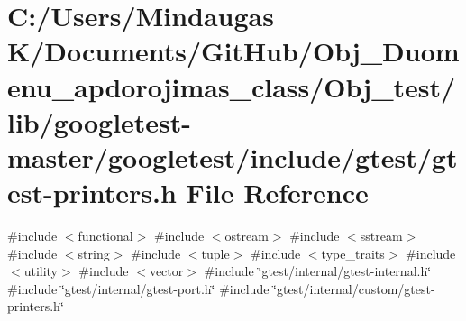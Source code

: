 \hypertarget{_obj__test_2lib_2googletest-master_2googletest_2include_2gtest_2gtest-printers_8h}{}\section{C\+:/\+Users/\+Mindaugas K/\+Documents/\+Git\+Hub/\+Obj\+\_\+\+Duomenu\+\_\+apdorojimas\+\_\+class/\+Obj\+\_\+test/lib/googletest-\/master/googletest/include/gtest/gtest-\/printers.h File Reference}
\label{_obj__test_2lib_2googletest-master_2googletest_2include_2gtest_2gtest-printers_8h}
{\ttfamily \#include $<$functional$>$}\newline
{\ttfamily \#include $<$ostream$>$}\newline
{\ttfamily \#include $<$sstream$>$}\newline
{\ttfamily \#include $<$string$>$}\newline
{\ttfamily \#include $<$tuple$>$}\newline
{\ttfamily \#include $<$type\+\_\+traits$>$}\newline
{\ttfamily \#include $<$utility$>$}\newline
{\ttfamily \#include $<$vector$>$}\newline
{\ttfamily \#include \char`\"{}gtest/internal/gtest-\/internal.\+h\char`\"{}}\newline
{\ttfamily \#include \char`\"{}gtest/internal/gtest-\/port.\+h\char`\"{}}\newline
{\ttfamily \#include \char`\"{}gtest/internal/custom/gtest-\/printers.\+h\char`\"{}}\newline
